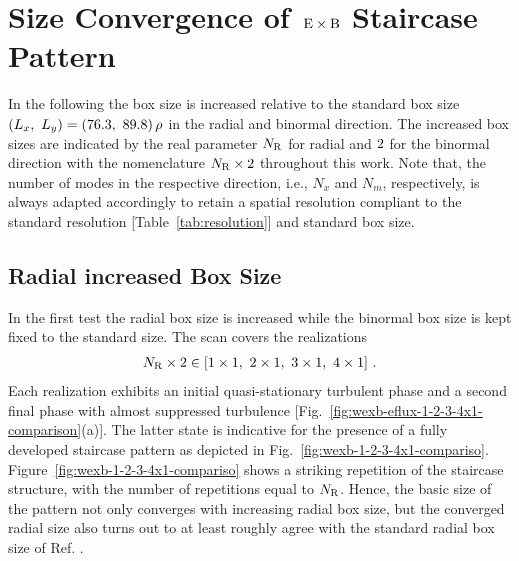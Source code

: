 
\newpage
\section{Size Convergence of $\mathrm{\:E}\times\mathrm{B}$ Staircase Pattern}
\label{sec:convergence}

In the following the box size is increased relative to the standard box size $(L_x,~L_y) = (76.3,~89.8)\,\rho$ in the radial and binormal direction. The increased box sizes are indicated by the real parameter $N_\mathrm{R}$ for radial and $2$ for the binormal direction with the nomenclature $N_\mathrm{R}\times 2$ throughout this work. 
Note that, the number of modes in the respective direction, i.e., $N_x$ and $N_m$, respectively, is always adapted accordingly to retain a spatial resolution compliant to the standard resolution [Table~\ref{tab:resolution}] and standard box size. \\

\subsection{Radial increased Box Size}
\label{sub:radial}

In the first test the radial box size is increased while the binormal box size is kept fixed to the standard size. The scan covers the realizations 
\begin{gather*}
	N_\mathrm{R} \times 2 \in [1\times1,~2\times1,~3\times1,~4\times1]~.
\end{gather*}
Each realization exhibits an initial quasi-stationary turbulent phase and a second final \cite{Peeters2016} phase with almost suppressed turbulence [Fig.~\ref{fig:wexb-eflux-1-2-3-4x1-comparison}(a)].
The latter state is indicative for the presence of a fully developed staircase pattern as depicted in Fig.~\ref{fig:wexb-1-2-3-4x1-compariso}. 
Figure~\ref{fig:wexb-1-2-3-4x1-compariso} shows a striking repetition of the staircase structure, with the number of repetitions equal to $N_\mathrm{R}$.
Hence, the basic size of the pattern not only converges with increasing radial box size, but the converged radial size also turns out to at least roughly agree with the standard radial box size of Ref. . \bigskip

